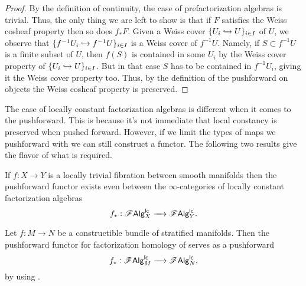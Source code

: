 \documentclass[../text.tex]{subfiles}
\begin{document}
\begin{proof}
    By the definition of continuity, the case of prefactorization algebras is trivial. Thus, the only thing we are left to show is that if $F$ satisfies the Weiss cosheaf property then so does $f_* F$. Given a Weiss cover $\{U_i \xhookrightarrow{} U\}_{i \in I}$ of $U$, we observe that $\{f^{-1}U_i \xhookrightarrow{} f^{-1}U\}_{i \in I}$ is a Weiss cover of $f^{-1}U$. Namely, if $S \subset f^{-1}U$ is a finite subset of $U$, then $f(S)$ is contained in some $U_i$ by the Weiss cover property of $\{U_i \xhookrightarrow{} U\}_{i \in I}$. But in that case $S$ has to be contained in $f^{-1}U_i$, giving it the Weiss cover property too. Thus, by the definition of the pushforward on objects the Weiss cosheaf property is preserved.
\end{proof}

The case of locally constant factorization algebras is different when it comes to the pushforward. This is because it's not immediate that local constancy is preserved when pushed forward. However, if we limit the types of maps we pushforward with we can still construct a functor. The following two results give the flavor of what is required.

\begin{proposition}
    If $f: X \rightarrow Y$ is a locally trivial fibration between smooth manifolds then the pushforward functor exists even between the $\infty$-categories of locally constant factorization algebras
    \begin{equation}
        f_*: \mathscr{F} \mathsf{Alg}^{\mathsf{lc}}_X \xrightarrow{\quad} \mathscr{F} \mathsf{Alg}^{\mathsf{lc}}_Y.
    \end{equation}
\end{proposition}

\begin{corollary}\label{cor:pushforward_for_lc}
    Let $f: M \xrightarrow{} N$ be a constructible bundle of stratified manifolds. Then the pushforward functor for factorization homology of  serves as a pushforward
    \begin{equation}
        f_*: \mathscr{F} \mathsf{Alg}^{\mathsf{lc}}_M \xrightarrow{\quad} \mathscr{F} \mathsf{Alg}^{\mathsf{lc}}_N,
    \end{equation}
    by using .
\end{corollary}
\end{document}
